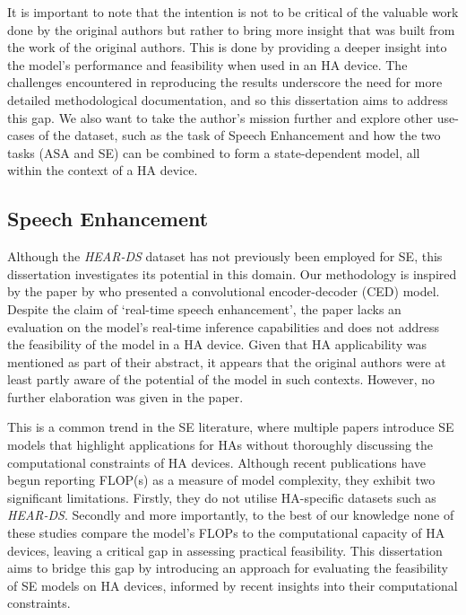 \documentclass[logo,bsc,singlespacing,parskip,online]{infthesis}
\newcommand{\heards}{\textit{HEAR-DS}\xspace}
\begin{document}
It is important to note that the intention is not to 
be critical of the valuable work done by the original authors 
but rather to bring more insight that was built from the work of the original authors.
This is done by providing a deeper insight into the model's performance 
and feasibility when used in an HA device. The challenges encountered 
in reproducing the results underscore the need for more 
detailed methodological documentation, and so this dissertation aims 
to address this gap. We also want to take the author's 
mission further and explore other use-cases of the dataset, 
such as the task of Speech Enhancement and how the two tasks 
(ASA and SE) can be combined to form a state-dependent model,
all within the context of a HA device.
\newpage

\subsection{Speech Enhancement}
Although the \heards dataset has not previously been employed 
for SE, this dissertation investigates its potential in this domain.
Our methodology is inspired by the paper by \citet{tan18_interspeech}
who presented a convolutional encoder-decoder (CED) model.
Despite the claim of `real-time speech enhancement', the paper 
lacks an evaluation on the model's real-time inference capabilities 
and does not address the feasibility of the model in a HA device. 
Given that HA applicability was mentioned as part of their abstract,
it appears that the original authors were at least partly 
aware of the potential of the model in such contexts. However, 
no further elaboration was given in the paper.

This is a common trend in the SE literature, where multiple papers
introduce SE models that highlight applications for HAs without 
thoroughly discussing the computational constraints of HA devices. 
Although recent publications \citep{DuSpiking2024,Sach2023EffCRNAE,Wang2025ZipEnhancerDD} 
have begun reporting FLOP(s) as a measure of model complexity,
they exhibit two significant limitations. Firstly, they do not utilise HA-specific datasets 
such as \heards. Secondly and more importantly, to the best of our knowledge
none of these studies compare the model's FLOPs to the computational capacity 
of HA devices, leaving a critical gap in assessing practical feasibility. 
This dissertation aims to bridge this gap by introducing an approach 
for evaluating the feasibility of SE models on HA devices, informed by 
recent insights into their computational constraints.
\end{document}
